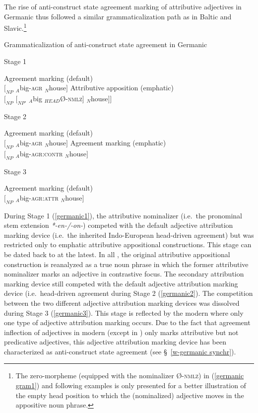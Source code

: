 {The rise of anti-construct state agreement marking of attributive adjectives in Germanic thus followed a similar grammaticalization path as in Baltic and Slavic.\footnote{The zero-morpheme (equipped with the nominalizer Ø-\textsc{nmlz}) in (\ref{germanic gram1}) and following examples is only presented for a better illustration of the empty head position to which the (nominalized) adjective moves in the appositive noun phrase.}
\begin{exe}
\ex \label{germanic gram1} 
	\rm{Grammaticalization of anti-construct state agreement in Germanic}
\begin{xlist}
\ex \label{germanic1}
	\rm{Stage 1}
\begin{xlist}
\ex	\rm{Agreement marking (default)}\\
$[_{NP}$ $_{A}$big-\textsc{agr} $_{N}$house$]$
\ex	\rm{Attributive apposition (emphatic)}\\
$[_{NP}$ $[_{NP'}$ $_{A}$big $_{HEAD}$Ø-\textsc{nmlz}$]$ $_{N}$house$] ]$\label{germanic art1}
\end{xlist}
\ex \label{germanic2}
	\rm{Stage 2} 
\begin{xlist}
\ex	\rm{Agreement marking (default)}\\
$[_{NP}$ $_{A}$big-\textsc{agr} $_{N}$house$]$
\ex	\rm{Agreement marking (emphatic)}\\
$[_{NP}$ $_{A}$big-\textsc{agr:contr} $_{N}$house$]$\label{germanic ACAgr}
\end{xlist}
\ex \label{germanic3}
	\rm{Stage 3}
\begin{xlist}
\ex 	\rm{Agreement marking (default)}\\
$[_{NP}$ $_{A}$big-\textsc{agr:attr} $_{N}$house$]$
\end{xlist}
\end{xlist}
\end{exe}
During Stage 1 (\ref{germanic1}), the attributive nominalizer (i.e.~the pronominal stem extension \textit{*-en-/-on-}) competed with the default adjective attribution marking device (i.e.~the inherited Indo-European head\hyp{}driven agreement) but was restricted only to emphatic attributive appositional constructions. This stage can be dated back to  at the latest. In all , the original attributive appositional construction is reanalyzed as a true noun phrase in which the former attributive nominalizer marks an adjective in contrastive focus. The secondary attribution marking device still competed with the default adjective attribution marking device (i.e.~head\hyp{}driven agreement during Stage 2 (\ref{germanic2}). The competition between the two different adjective attribution marking devices was dissolved during Stage 3 (\ref{germanic3}). This stage is reflected by the modern  where only one type of adjective attribution marking occurs. Due to the fact that agreement inflection of adjectives in modern  (except in ) only marks attributive but not predicative adjectives, this adjective attribution marking device has been characterized as anti-construct state agreement (see \S~\ref{w-germanic synchr}).

}
